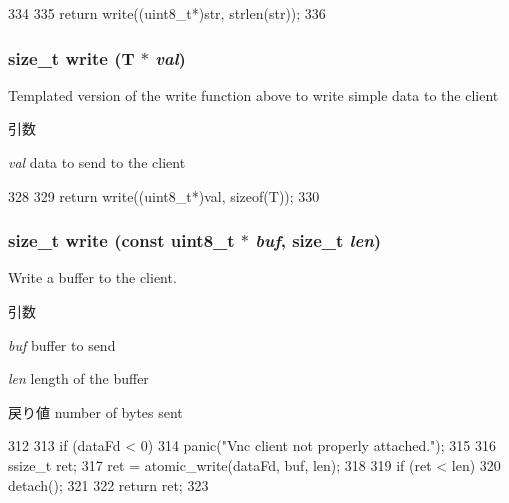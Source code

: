 \begin{DoxyCode}
334 {
335     return write((uint8_t*)str, strlen(str));
336 }
\end{DoxyCode}
\hypertarget{classVncServer_aefa1c03e3a1158303080d2702de2a11e}{
\subsubsection[{write}]{\setlength{\rightskip}{0pt plus 5cm}size\_\-t write (T $\ast$ {\em val})}}
\label{classVncServer_aefa1c03e3a1158303080d2702de2a11e}
Templated version of the write function above to write simple data to the client 
\begin{DoxyParams}{引数}
\item[{\em val}]data to send to the client \end{DoxyParams}



\begin{DoxyCode}
328 {
329     return write((uint8_t*)val, sizeof(T));
330 }
\end{DoxyCode}
\hypertarget{classVncServer_a215d71301eb6ae0ebffc5d2f8fe4a140}{
\subsubsection[{write}]{\setlength{\rightskip}{0pt plus 5cm}size\_\-t write (const uint8\_\-t $\ast$ {\em buf}, \/  size\_\-t {\em len})}}
\label{classVncServer_a215d71301eb6ae0ebffc5d2f8fe4a140}
Write a buffer to the client. 
\begin{DoxyParams}{引数}
\item[{\em buf}]buffer to send \item[{\em len}]length of the buffer \end{DoxyParams}
\begin{DoxyReturn}{戻り値}
number of bytes sent 
\end{DoxyReturn}



\begin{DoxyCode}
312 {
313     if (dataFd < 0)
314         panic("Vnc client not properly attached.\n");
315 
316     ssize_t ret;
317     ret = atomic_write(dataFd, buf, len);
318 
319     if (ret < len)
320         detach();
321 
322     return ret;
323 }
\end{DoxyCode}


